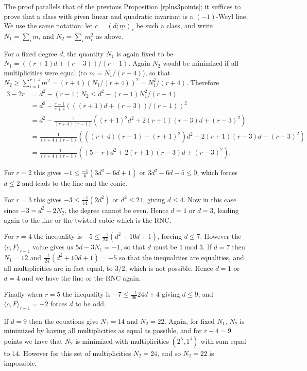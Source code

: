 \documentclass[12pt]{article}
\numberwithin{equation}{section}
\numberwithin{subeq}{equation}
\def\mod{\text{mod}\;}
\begin{document}
\medskip{}
The proof parallels that of the previous Proposition \ref{rplus3points};
it suffices to prove that a class
with given linear and quadratic invariant is a $(-1)$-Weyl line.
We use the same notation:
let $c = (d;\underline{m})_r$ be such a class, and write
$N_1 = \sum_i m_i$ and $N_2 = \sum_i m_i^2$ as above.

For a fixed degree $d$, the quantity $N_1$ is again fixed to be
$N_1 = ((r+1)d + (r-3))/(r-1)$.
Again $N_2$ would be minimized if all multiplicities were equal (to $m=N_1/(r+4)$), so that
$N_2 \geq \sum_{i=1}^{r+4} m^2 = (r+4)(N_1/(r+4))^2 = N_1^2/(r+4)$.
Therefore
\begin{align*}
3-2r &= d^2-(r-1)N_2 \leq d^2 - (r-1) N_1^2/(r+4) \\
&= d^2 - \frac{r-1}{r+4}(((r+1)d + (r-3))/(r-1))^2 \\
&= d^2 - \frac{1}{(r+4)(r-1)} ((r+1)^2 d^2 + 2(r+1)(r-3) d + (r-3)^2) \\
&= \frac{1}{(r+4)(r-1)} ( ((r+4)(r-1)-(r+1)^2)d^2 - 2(r+1)(r-3) d - (r-3)^2 ) \\
&= \frac{-1}{(r+4)(r-1)} ( (5-r)d^2 + 2(r+1)(r-3) d + (r-3)^2 ).
\end{align*}

For $r=2$ this gives $-1 \leq \frac{-1}{6}(3d^2-6d +1)$
or $3d^2-6d-5 \leq 0$, which forces $d \leq 2$ and leads to the line and the conic.

For $r=3$ this gives $-3 \leq \frac{-1}{14}(2d^2)$
or $d^2 \leq 21$, giving $d \leq 4$.
Now in this case since $-3  = d^2-2N_2$,
the degree cannot be even.  Hence $d = 1$ or $d=3$,
leading again to the line or the twisted cubic which is the RNC.

For $r=4$ the inequality is $-5 \leq \frac{-1}{24}(d^2 + 10d + 1)$,
forcing $d \leq 7$.
However the $\langle c, F\rangle_{r-1}$ value gives us $5d-3N_1 = -1$, so that $d$ must be $1\;\mod 3$.
If $d=7$ then $N_1 = 12$ and $\frac{-1}{24}(d^2 + 10d + 1) = -5$ so that the inequalities are equalities,
and all multiplicities are in fact equal, to $3/2$, which is not possible.
Hence $d=1$ or $d=4$ and we have the line or the RNC again.

Finally when $r=5$ the inequality is $-7 \leq \frac{-1}{36}{24d + 4}$ giving $d \leq 9$,
and $\langle c,F\rangle_{r-1}= -2$ forces $d$ to be odd.

If $d=9$ then the equations give $N_1=14$ and $N_2 = 22$.
Again, for fixed $N_1$, $N_2$ is minimized by having all multiplicities as equal as possible,
and for $r+4=9$ points we have that $N_2$ is minimized with multiplicities $(2^5,1^4)$ with sum equal to $14$.
However for this set of multiplicities $N_2 = 24$, and so $N_2=22$ is impossible.
\end{document}
